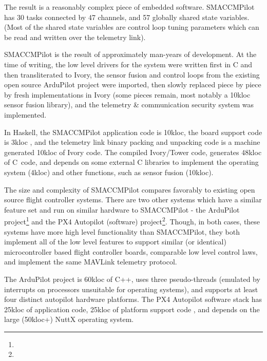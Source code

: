 The result is a reasonably complex piece of embedded software.  SMACCMPilot has
30 tasks connected by 47 channels, and 57 globally shared state variables. (Most
of the shared state variables are control loop tuning parameters which can be
read and written over the telemetry link).


SMACCMPilot is the result of approximately  man-years of development. At the
time of writing, the low level drivers for the system were written first in C
and then transliterated to Ivory, the sensor fusion and control loops from the
existing open source ArduPilot project were imported, then slowly replaced piece
by piece by fresh implementations in Ivory (some pieces remain, most notably a
10kloc sensor fusion library), and the telemetry \& communication security
system was implemented.

In Haskell, the SMACCMPilot application code is 10kloc, the board support code
is 3kloc , and the telemetry link binary packing and unpacking
code is a machine generated 10kloc of Ivory code. The compiled Ivory/Tower code,
generates 48kloc of C~code, and depends on some external C libraries to
implement the operating system (4kloc) and other functions, such as sensor
fusion (10kloc).

The size and complexity of SMACCMPilot compares favorably to existing open
source flight controller systems. There are two other systems which have a
similar feature set and run on similar hardware to SMACCMPilot - the ArduPilot
project\footnote{} and the PX4 Autopilot (software)
project\footnote{}. Though, in both cases, these systems have
more high level functionality than SMACCMPilot, they both implement all of the
low level features to support similar (or identical) microcontroller based
flight controller boards, comparable low level control laws, and implement the
same MAVLink telemetry protocol.

The ArduPilot project is 60kloc of C++, uses three pseudo-threads (emulated by
interrupts on processors unsuitable for operating systems), and supports at
least four distinct autopilot hardware platforms. The PX4 Autopilot software
stack has 25kloc of application code, 25kloc of platform support code , and
depends on the large (50kloc+) NuttX operating system.


